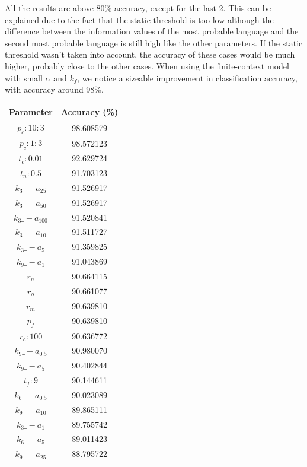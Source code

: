 \documentclass{article}
\begin{document}
All the results are above 80\% accuracy, except for the last 2. This can be explained due to the fact that the static threshold is too low
although the difference between the information values of the most probable language and the second most probable language is still high like the other parameters.
If the static threshold wasn't taken into account, the accuracy of these cases would be much higher, probably close to the other cases. 
When using the finite-context model with small $\alpha$ and $k_f$, we notice a sizeable improvement in classification accuracy, with accuracy around 98\%.


\begin{table}
    \centering
    \begin{tabular}{|c|c|}
    \hline
    \textbf{Parameter} & \textbf{Accuracy (\%)} \\ \hline
    $p_c:10:3$ & 98.608579 \\ \hline
    $p_c:1:3$ & 98.572123 \\ \hline
    $t_c:0.01$ & 92.629724 \\ \hline
    $t_n:0.5$ & 91.703123 \\ \hline
    $k_3\_-a_{25}$ & 91.526917 \\ \hline
    $k_3\_-a_{50}$ & 91.526917 \\ \hline
    $k_3\_-a_{100}$ & 91.520841 \\ \hline
    $k_3\_-a_{10}$ & 91.511727 \\ \hline
    $k_3\_-a_5$ & 91.359825 \\ \hline
    $k_9\_-a_1$ & 91.043869 \\ \hline
    $r_n$ & 90.664115 \\ \hline
    $r_o$ & 90.661077 \\ \hline
    $r_m$ & 90.639810 \\ \hline
    $p_f$ & 90.639810 \\ \hline
    $r_c:100$ & 90.636772 \\ \hline
    $k_9\_-a_{0.5}$ & 90.980070 \\ \hline
    $k_9\_-a_5$ & 90.402844 \\ \hline
    $t_f:9$ & 90.144611 \\ \hline
    $k_6\_-a_{0.5}$ & 90.023089 \\ \hline
    $k_9\_-a_{10}$ & 89.865111 \\ \hline
    $k_3\_-a_1$ & 89.755742 \\ \hline
    $k_6\_-a_5$ & 89.011423 \\ \hline
    $k_9\_-a_{25}$ & 88.795722 \\ \hline

\end{tabular}
\end{table}
\end{document}
